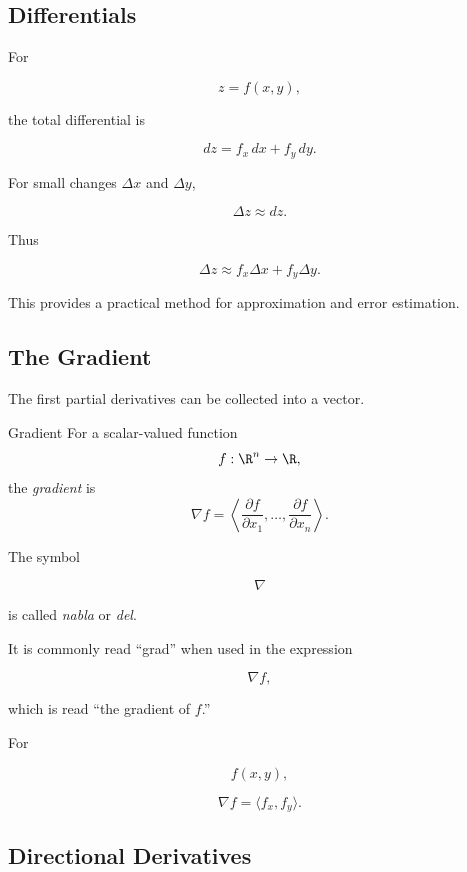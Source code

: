 \subsection{Differentials}
\label{subsec:multivariable-differentials}

For

\[ z=f(x,y), \]

the total differential is

\[ dz=f_x\,dx+f_y\,dy. \]

For small changes \(\Delta x\) and \(\Delta y\),

\[ \Delta z\approx dz. \]

Thus

\[ \Delta z
\approx
f_x\Delta x+f_y\Delta y. \]

This provides a practical method for approximation and error estimation.

\subsection{The Gradient}
\label{subsec:gradient}

The first partial derivatives can be collected into a vector.

\begin{definitionbox}{Gradient}
For a scalar-valued function
\[ f:\R^n\to\R, \]
the \emph{gradient} is
\[ \nabla f
=
\left\langle
\frac{\partial f}{\partial x_1},
\ldots,
\frac{\partial f}{\partial x_n}
\right\rangle.
\]
\end{definitionbox}

The symbol

\[ \nabla \]

is called \emph{nabla} or \emph{del}.

It is commonly read ``grad'' when used in the expression

\[ \nabla f, \]

which is read ``the gradient of \(f\).''

For

\[ f(x,y), \]

\[ \nabla f=\langle f_x,f_y\rangle. \]

\subsection{Directional Derivatives}
\label{subsec:directional-derivatives}


